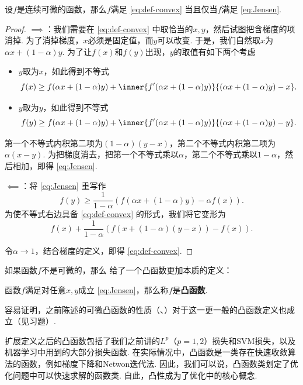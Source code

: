 \begin{theorem}\label{thm:convex-equivalence}
    设$f$是连续可微的函数，那么$f$满足 \eqref{eq:def-convex} 当且仅当$f$满足 \eqref{eq:Jensen}.
\end{theorem}
\begin{proof}
    $\implies$：我们需要在 \eqref{eq:def-convex} 中取恰当的$x,y$，然后试图把含梯度的项消掉. 为了消掉梯度，$x$必须是固定值，而$y$可以改变. 于是，我们自然取$x$为$\alpha x+(1-\alpha) y$. 为了让$f(x)$和$f(y)$出现，$y$的取值有如下两个考虑
    \begin{itemize}
        \item $y$取为$x$，如此得到不等式
        \[
            f(x)\geq f(\alpha x+(1-\alpha) y) + \inner{f'(\alpha x+(1-\alpha) y)}{(\alpha x+(1-\alpha) y)-x}.
        \]
        \item $y$取为$y$，如此得到不等式
        \[
            f(y)\geq f(\alpha x+(1-\alpha) y) + \inner{f'(\alpha x+(1-\alpha) y)}{(\alpha x+(1-\alpha) y)-y}.
        \]
    \end{itemize}

    第一个不等式内积第二项为$(1-\alpha)(y-x)$，第二个不等式内积第二项为$\alpha(x-y)$. 为把梯度消去，把第一个不等式乘以$\alpha$，第二个不等式乘以$1-\alpha$，然后相加，即得 \eqref{eq:Jensen}.

    $\impliedby$：将 \eqref{eq:Jensen} 重写作
    \[
    f(y)\geq\frac{1}{1-\alpha}(f(\alpha x+(1-\alpha) y)-\alpha f(x)).
    \]
    为使不等式右边具备 \eqref{eq:def-convex} 的形式，我们将它变形为
    \[f(x)+\frac{1}{1-\alpha}(f(x+(1-\alpha) (y-x))-f(x)).\]
    
    令$\alpha\to 1$，结合梯度的定义，即得 \eqref{eq:def-convex}.
\end{proof}

如果函数$f$不是可微的，那么 给了一个凸函数更加本质的定义：
\begin{definition}[凸函数]
    函数$f$满足对任意$x,y$成立 \eqref{eq:Jensen}，那么称$f$是\textbf{凸函数}.
\end{definition}

容易证明，之前陈述的可微凸函数的性质（、）对于这一更一般的凸函数定义也成立（见习题）.

扩展定义之后的凸函数包括了我们之前讲的$L^p$（$p=1,2$）损失和SVM损失，以及机器学习中用到的大部分损失函数. 在实际情况中，凸函数是一类存在快速收敛算法的函数，例如梯度下降和Netwon迭代法. 因此，我们可以说，凸函数类划定了优化问题中可以快速求解的函数类. 自此，凸性成为了优化中的核心概念. 

